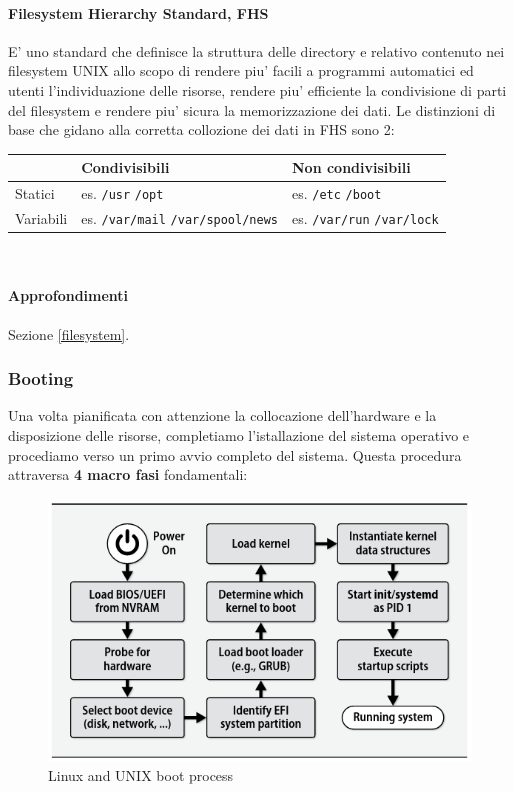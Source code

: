 \paragraph{Filesystem Hierarchy Standard, FHS}
E' uno standard che definisce la struttura delle directory e relativo contenuto nei filesystem UNIX allo scopo di rendere piu' facili a programmi automatici ed utenti l'individuazione delle risorse, rendere piu' efficiente la condivisione di parti del filesystem e rendere piu' sicura la memorizzazione dei dati.
Le distinzioni di base che gidano alla corretta collozione dei dati in FHS sono 2:
\\
\begin{center}
\begin{tabular}{|l|l|l|}
	\hline
	& Condivisibili & Non condivisibili \\\hline
	Statici & es. \texttt{/usr} \texttt{/opt} & es. \texttt{/etc} \texttt{/boot} \\\hline
	Variabili & es. \texttt{/var/mail} \texttt{/var/spool/news} & es. \texttt{/var/run} \texttt{/var/lock} \\\hline
\end{tabular}
\end{center}
\\
\paragraph{Approfondimenti} Sezione \ref{filesystem}.


\subsubsection{Booting}
Una volta pianificata con attenzione la collocazione dell'hardware e la disposizione delle risorse, completiamo l'istallazione del sistema operativo e procediamo verso un primo avvio completo del sistema. Questa procedura attraversa \textbf{4 macro fasi} fondamentali:

\begin{figure}[H]
	\centering
	\includegraphics[scale=1]{img/linuxunixbootprocess.png}
	\caption{Linux and UNIX boot process}
\end{figure}

